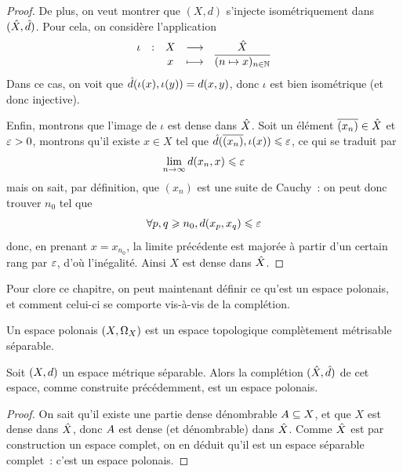 \begin{proof}
  De plus, on veut montrer que $(X,d)$ s'injecte isométriquement dans
  $(\hat{X},\hat{d})$. Pour cela, on considère l'application
  \[
  \makeFun{\iota}{X}{\compl X}{x}{\clas{(n \mapsto x)_{n \in \bN}}}
  \]
  Dans ce cas, on voit que $\hat{d}(\iota(x),\iota(y)) = d(x,y)$, donc
  $\iota$ est bien isométrique (et donc injective).

  Enfin, montrons que l'image de $\iota$ est dense dans $\hat{X}$. Soit un
  élément $\overline{(x_n)}\in\hat{X}$ et $\varepsilon > 0$, montrons qu'il
  existe $x\in X$ tel que $\hat{d}(\overline{(x_n)},\iota(x)) \leqslant\varepsilon$,
  ce qui se traduit par
  \[\lim_{n\to\infty} d(x_n,x) \leqslant \varepsilon\]
  mais on sait, par définition, que $(x_n)$ est une suite de Cauchy~: on peut
  donc trouver $n_0$ tel que
  \[\forall p,q \geqslant n_0, d(x_p,x_q) \leqslant\varepsilon\]
  donc, en prenant $x = x_{n_0}$, la limite précédente est majorée à partir
  d'un certain rang par $\varepsilon$, d'où l'inégalité. Ainsi $X$ est dense
  dans $\hat{X}$.
\end{proof}

\noindent
Pour clore ce chapitre, on peut maintenant définir ce qu'est un espace polonais,
et comment celui-ci se comporte vis-à-vis de la complétion.

\begin{definition}
  Un espace polonais $(X,\Omega_{X})$ est un espace topologique complètement
  métrisable séparable.
\end{definition}

\begin{proposition}
  Soit $(X,d)$ un espace métrique séparable. Alors la complétion
  $(\hat{X},\hat{d})$ de cet espace, comme construite précédemment, est un
  espace polonais.
\end{proposition}

\begin{proof}
  On sait qu'il existe une partie dense dénombrable $A\subseteq X$, et que
  $X$ est dense dans $\hat{X}$, donc $A$ est dense (et dénombrable) dans
  $\hat{X}$. Comme $\hat{X}$ est par construction un espace complet, on en
  déduit qu'il est un espace séparable complet~: c'est un espace polonais.
\end{proof}






